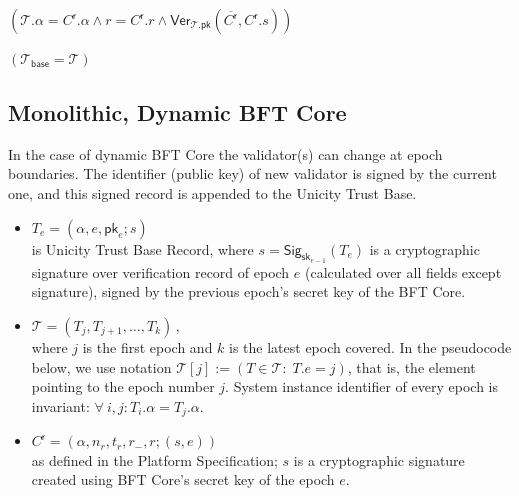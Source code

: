\begin{algorithmic}[0]
    \State \Return $(\mathcal{T}.\alpha = C^\mathsf{r}.\alpha \land r = C^\mathsf{r}.r  \land \mathsf{Ver}_{\mathcal{T}.\mathsf{pk}}(\overline{C^\mathsf{r}}, C^\mathsf{r}.s))$  
  \EndFunction
\end{algorithmic}

\begin{algorithmic}[0]
    \State \Return $(\mathcal{T}_\mathsf{base} = \mathcal{T})$  
  \EndFunction
\end{algorithmic}


\subsection{Monolithic, Dynamic BFT Core}\label{ch:m-rc}

In the case of dynamic BFT Core the validator(s) can change at epoch boundaries. The identifier (public key) of new validator is signed by the current one, and this signed record is appended to the Unicity Trust Base.

\begin{itemize}
  \item $T_e = (\alpha, e, \mathsf{pk}_e; s)$ \\
  is Unicity Trust Base Record, where $s = \mathsf{Sig}_{\mathsf{sk}_{e-1}}(T_e)$ is a cryptographic signature over verification record of epoch $e$ (calculated over all fields except signature), signed by the previous epoch's secret key of the BFT Core.
  \item $\mathcal{T} = (T_j, T_{j+1}, \ldots, T_k)$\,, \\
  where $j$ is the first epoch and $k$ is the latest epoch covered. In the pseudocode below, we use notation $\mathcal{T}[j] := (T \in \mathcal{T}\colon \; T.e = j )$, that is, the element pointing to the epoch number $j$. System instance identifier of every epoch is invariant: $\forall\ i, j \colon T_i.\alpha = T_j.\alpha$.
  \item $C^\mathsf{r} = (\alpha, n_r, t_r, r_-, r; (s, e))$  \\
  as defined in the Platform Specification; $s$ is a cryptographic signature created using BFT Core's secret key of the epoch $e$.
\end{itemize}

